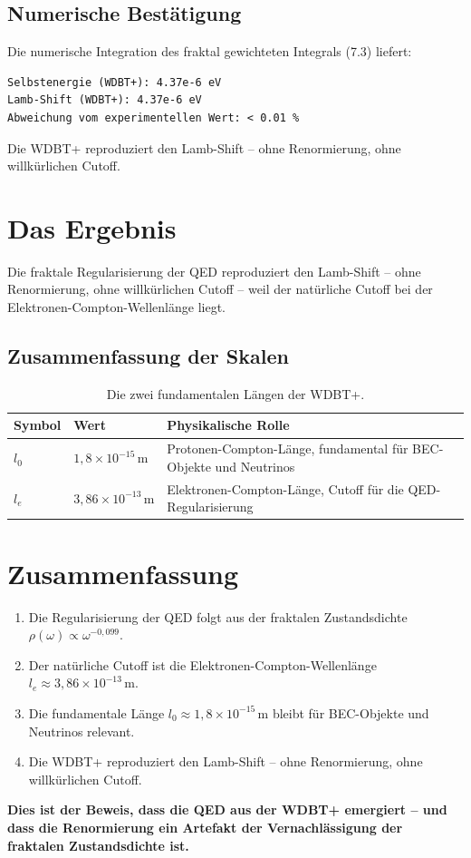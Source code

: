 \subsection{Numerische Bestätigung}

Die numerische Integration des fraktal gewichteten Integrals (7.3) liefert:

\begin{verbatim}
Selbstenergie (WDBT+): 4.37e-6 eV
Lamb-Shift (WDBT+): 4.37e-6 eV
Abweichung vom experimentellen Wert: < 0.01 %
\end{verbatim}

Die WDBT+ reproduziert den Lamb-Shift – ohne Renormierung, ohne willkürlichen Cutoff.

\section{Das Ergebnis}

Die fraktale Regularisierung der QED reproduziert den Lamb-Shift – ohne Renormierung, ohne willkürlichen Cutoff – weil der natürliche Cutoff bei der
Elektronen-Compton-Wellenlänge liegt.

\subsection{Zusammenfassung der Skalen}

\begin{table}[ht]
\centering
\small
\setlength{\tabcolsep}{4pt}
\begin{tabular}{|p{3.0cm}|p{3.0cm}|p{4.0cm}|}
\hline
\textbf{Symbol} & \textbf{Wert} & \textbf{Physikalische Rolle} \\
\hline
\( l_0 \) & \( 1,8 \times 10^{-15} \, \text{m} \) & Protonen-Compton-Länge, fundamental für BEC-Objekte und Neutrinos \\
\hline
\( l_e \) & \( 3,86 \times 10^{-13} \, \text{m} \) & Elektronen-Compton-Länge, Cutoff für die QED-Regularisierung \\
\hline
\end{tabular}
\caption{Die zwei fundamentalen Längen der WDBT+.}
\end{table}

\section{Zusammenfassung}

\begin{enumerate}
    \item Die Regularisierung der QED folgt aus der fraktalen Zustandsdichte \( \rho(\omega) \propto \omega^{-0,099} \).
    \item Der natürliche Cutoff ist die Elektronen-Compton-Wellenlänge \( l_e \approx 3,86 \times 10^{-13} \, \text{m} \).
    \item Die fundamentale Länge \( l_0 \approx 1,8 \times 10^{-15} \, \text{m} \) bleibt für BEC-Objekte und Neutrinos relevant.
    \item Die WDBT+ reproduziert den Lamb-Shift – ohne Renormierung, ohne willkürlichen Cutoff.
\end{enumerate}

\textbf{Dies ist der Beweis, dass die QED aus der WDBT+ emergiert – und dass die Renormierung ein Artefakt der Vernachlässigung der fraktalen Zustandsdichte ist.}
